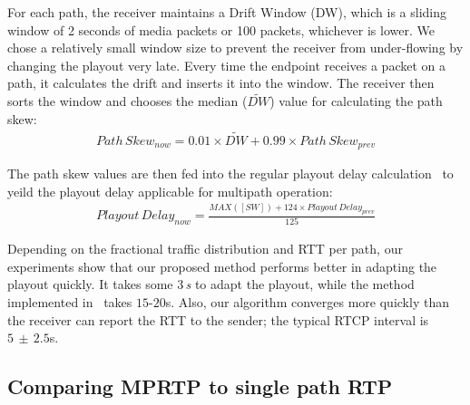 For each path, the receiver maintains a Drift Window (DW), which is a sliding
window of 2 seconds of media packets or 100 packets, whichever is lower. We
chose a relatively small window size to prevent the receiver from under-flowing
by changing the playout very late. Every time the endpoint receives a packet
on a path, it calculates the drift and inserts it into the window. The
receiver then sorts the window and chooses the median ($\widetilde{DW}$) value
for calculating the path skew: 
\begin{align*}
Path\,Skew_{now} = 0.01 \times \widetilde{DW} + 0.99\times Path\,Skew_{prev}
\end{align*}

The path skew values are then fed into the regular playout delay
calculation~\cite{Fober05,Colin03} to yeild the playout delay  applicable for
multipath operation:
\begin{align*}
Playout\,Delay_{now} = \frac{MAX([SW]) + 124 \times Playout\,Delay_{prev}}{125}
\end{align*}

Depending on the fractional traffic distribution and RTT per path, our
experiments show that our proposed method performs better in adapting the
playout quickly. It takes some 3\,\emph{s} to adapt the playout, while the method
implemented in~\cite{Fober05,Colin03} takes $15$-$20$s. Also, our algorithm
converges more quickly than the receiver can report the RTT to the sender; the
typical RTCP interval is $5\,\pm\,2.5$s.

\subsection{Comparing MPRTP to single path RTP}


